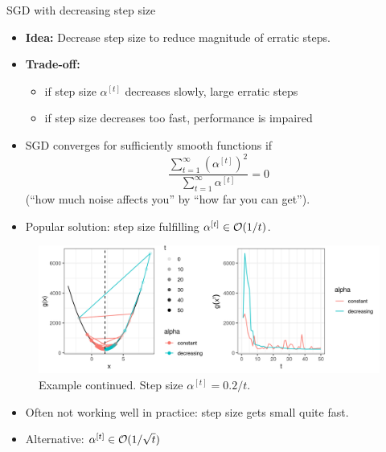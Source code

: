 \documentclass[11pt,compress,t,notes=noshow, xcolor=table]{beamer}
\begin{document}
\begin{vbframe}{SGD with decreasing step size}

\begin{itemize}
	\item \textbf{Idea:} Decrease step size to reduce magnitude of erratic steps.
	\item \textbf{Trade-off:}
	\begin{itemize}
		\item if step size $\alpha^{[t]}$ decreases slowly, large erratic steps%
		\item if step size decreases too fast, performance is impaired
	\end{itemize}
	\item SGD converges for sufficiently smooth functions if 
	$$
		\frac{\sum_{t = 1}^\infty \left(\alpha^{[t]}\right)^2}{\sum_{t = 1}^\infty \alpha^{[t]}} = 0
	$$
	(\enquote{how much noise affects you} by \enquote{how far you can get}).
\end{itemize}	

\framebreak 

\begin{itemize}
	\item Popular solution: step size fulfilling $\alpha^{[t]} \in \mathcal{O}(1/t)$. 
\end{itemize}

\begin{figure}
    \centering
    \includegraphics[width = 1\textwidth]{figure_man/sgd_example_decreasing_step_size.png}
    \caption*{Example continued.
        Step size $\alpha^{[t]} = 0.2/t$. }
\end{figure}

\vspace{-0.5\baselineskip}

\begin{itemize}
 	\item Often not working well in practice: step size gets small quite fast.
 	\item Alternative: $\alpha^{[t]} \in \mathcal{O}(1/\sqrt{t})$
\end{itemize}

\end{vbframe}
\end{document}
